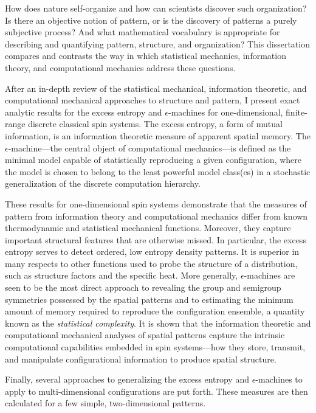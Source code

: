 

How does nature self-organize and how can scientists discover such
organization?  Is there an objective notion of pattern, or is the
discovery of patterns a purely subjective process?  And what
mathematical vocabulary is appropriate for describing and quantifying
pattern, structure, and organization?  This dissertation compares and
contrasts the way in which statistical mechanics, information theory,
and computational mechanics address these questions.



After an in-depth review of the statistical mechanical, information
theoretic, and computational mechanical approaches to structure and
pattern, I present exact analytic results for the excess entropy and
$\epsilon$-machines for one-dimensional, finite-range discrete
classical spin systems.  The excess entropy, a form of mutual
information, is an information theoretic measure of apparent spatial
memory.  The $\epsilon$-machine---the central object of computational
mechanics---is defined as the minimal model capable of statistically
reproducing a given configuration, where the model is chosen to belong
to the least powerful model class(es) in a stochastic generalization
of the discrete computation hierarchy. 


These results for one-dimensional spin systems
demonstrate that the measures of pattern from information 
theory and computational mechanics differ from known thermodynamic and
statistical mechanical functions. Moreover, they capture important
structural features that are otherwise missed. In particular, the
excess entropy serves to detect ordered, low entropy 
density patterns. It is superior in many respects to other functions
used to probe the structure of a distribution, such as
structure factors and the specific heat.   More generally,
$\epsilon$-machines are seen to be the most direct approach to
revealing the group and semigroup symmetries possessed by 
the spatial patterns and to estimating the minimum amount of memory
required to reproduce the configuration ensemble, a quantity known as
the {\em statistical complexity}.  It is shown that the information
theoretic and computational mechanical analyses of spatial patterns
capture the intrinsic computational capabilities embedded in spin
systems---how they store, transmit, and manipulate configurational
information to produce spatial structure. 


Finally, several approaches to generalizing the excess entropy and
$\epsilon$-machines to apply to multi-dimensional configurations are
put forth.  These measures are then calculated for a few simple,
two-dimensional patterns.  


